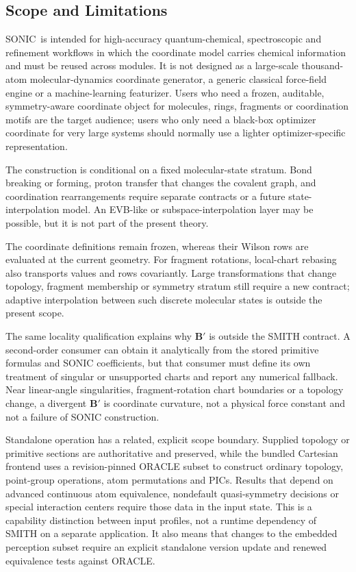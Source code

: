 \documentclass[journal=jctcce,manuscript=article,layout=traditional]{achemso}
\newcommand{\SONIC}{SONIC}
\newcommand{\Bmat}{\mathbf{B}}
\theoremstyle{definition}
\begin{document}
\subsection{Scope and Limitations}
\label{sec:scope-limitations}

\SONIC\ is intended for high-accuracy quantum-chemical, spectroscopic and
refinement workflows in which the coordinate model carries chemical information
and must be reused across modules.  It is not designed as a large-scale
thousand-atom molecular-dynamics coordinate generator, a generic classical
force-field engine or a machine-learning featurizer.  Users who need a frozen,
auditable, symmetry-aware coordinate object for molecules, rings, fragments
or coordination motifs are the target audience; users who only need a
black-box optimizer coordinate for very large systems should normally use a
lighter optimizer-specific representation.

The construction is conditional on a fixed molecular-state stratum.  Bond
breaking or forming, proton transfer that changes the covalent graph, and
coordination rearrangements require separate contracts or a future
state-interpolation model.  An EVB-like or subspace-interpolation layer may be
possible, but it is not part of the present theory.

The coordinate definitions remain frozen, whereas their Wilson rows are
evaluated at the current geometry.  For fragment rotations, local-chart
rebasing also transports values and rows covariantly.  Large transformations
that change topology, fragment membership or symmetry stratum still require a
new contract; adaptive interpolation between such discrete molecular states is
outside the present scope.

The same locality qualification explains why \(\Bmat'\) is outside the SMITH
contract.  A second-order consumer can obtain it analytically from the stored
primitive formulas and SONIC coefficients, but that consumer must define its
own treatment of singular or unsupported charts and report any numerical
fallback.  Near linear-angle singularities, fragment-rotation chart boundaries
or a topology change, a divergent \(\Bmat'\) is coordinate curvature, not a
physical force constant and not a failure of SONIC construction.

Standalone operation has a related, explicit scope boundary.  Supplied
topology or primitive sections are authoritative and preserved, while the
bundled Cartesian frontend uses a revision-pinned ORACLE subset to construct
ordinary topology, point-group operations, atom permutations and PICs.  Results
that depend on advanced continuous atom equivalence, nondefault quasi-symmetry
decisions or special interaction centers require those data in the input state.
This is a capability distinction between input profiles, not a runtime
dependency of SMITH on a separate application.  It also means that changes to
the embedded perception subset require an explicit standalone version update
and renewed equivalence tests against ORACLE.
\end{document}
